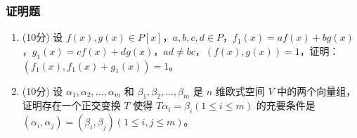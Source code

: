 \subsubsection*{证明题}

\begin{enumerate}
    \item (10分) 设 \(f(x),g(x)\in P[x]\)，\(a,b,c,d \in P\)，\(f_{1}(x)=af(x)+bg(x)\)，\(g_{1}(x)=cf(x)+dg(x)\)，\(ad \neq bc\)，\((f(x),g(x))=1\)，证明：\((f_{1}(x),f_{1}(x)+g_{1}(x))=1\)。

    \item (10分) 设 \(\alpha_{1},\alpha_{2},\dots,\alpha_{m}\) 和 \(\beta_{1},\beta_{2},\dots,\beta_{m}\) 是 \(n\) 维欧式空间 \(V\) 中的两个向量组，证明存在一个正交变换 \(T\) 使得 \(T\alpha_{i}=\beta_{i}(1 \leq i \leq m)\) 的充要条件是 \((\alpha_{i},\alpha_{j})=(\beta_{i},\beta_{j})(1 \leq i,j \leq m)\)。
\end{enumerate}